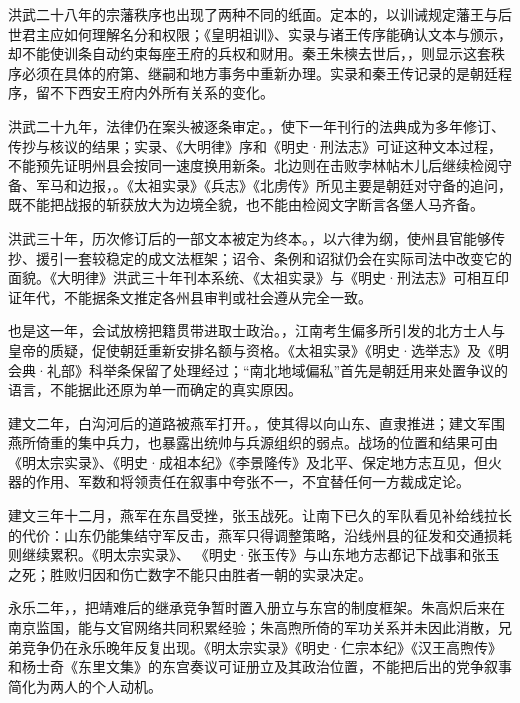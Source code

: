 洪武二十八年的宗藩秩序也出现了两种不同的纸面。定本的，以训诫规定藩王与后世君主应如何理解名分和权限；《皇明祖训》、实录与诸王传序能确认文本与颁示，却不能使训条自动约束每座王府的兵权和财用。秦王朱樉去世后，，则显示这套秩序必须在具体的府第、继嗣和地方事务中重新办理。实录和秦王传记录的是朝廷程序，留不下西安王府内外所有关系的变化。

洪武二十九年，法律仍在案头被逐条审定。，使下一年刊行的法典成为多年修订、传抄与核议的结果；实录、《大明律》序和《明史·刑法志》可证这种文本过程，不能预先证明州县会按同一速度换用新条。北边则在击败孛林帖木儿后继续检阅守备、军马和边报，。《太祖实录》《兵志》《北虏传》所见主要是朝廷对守备的追问，既不能把战报的斩获放大为边境全貌，也不能由检阅文字断言各堡人马齐备。

洪武三十年，历次修订后的一部文本被定为终本。，以六律为纲，使州县官能够传抄、援引一套较稳定的成文法框架；诏令、条例和诏狱仍会在实际司法中改变它的面貌。《大明律》洪武三十年刊本系统、《太祖实录》与《明史·刑法志》可相互印证年代，不能据条文推定各州县审判或社会遵从完全一致。

也是这一年，会试放榜把籍贯带进取士政治。，江南考生偏多所引发的北方士人与皇帝的质疑，促使朝廷重新安排名额与资格。《太祖实录》《明史·选举志》及《明会典·礼部》科举条保留了处理经过；“南北地域偏私”首先是朝廷用来处置争议的语言，不能据此还原为单一而确定的真实原因。

建文二年，白沟河后的道路被燕军打开。，使其得以向山东、直隶推进；建文军围燕所倚重的集中兵力，也暴露出统帅与兵源组织的弱点。战场的位置和结果可由《明太宗实录》、《明史·成祖本纪》《李景隆传》及北平、保定地方志互见，但火器的作用、军数和将领责任在叙事中夸张不一，不宜替任何一方裁成定论。

建文三年十二月，燕军在东昌受挫，张玉战死。让南下已久的军队看见补给线拉长的代价：山东仍能集结守军反击，燕军只得调整策略，沿线州县的征发和交通损耗则继续累积。《明太宗实录》、 《明史·张玉传》与山东地方志都记下战事和张玉之死；胜败归因和伤亡数字不能只由胜者一朝的实录决定。

永乐二年，，把靖难后的继承竞争暂时置入册立与东宫的制度框架。朱高炽后来在南京监国，能与文官网络共同积累经验；朱高煦所倚的军功关系并未因此消散，兄弟竞争仍在永乐晚年反复出现。《明太宗实录》《明史·仁宗本纪》《汉王高煦传》和杨士奇《东里文集》的东宫奏议可证册立及其政治位置，不能把后出的党争叙事简化为两人的个人动机。

